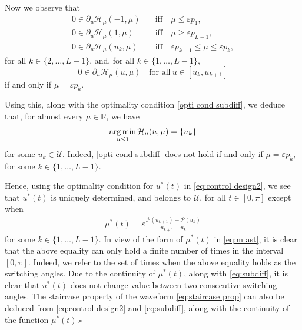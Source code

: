 \documentclass[twocolumn]{autart}    %
\begin{document}
Now we observe that
\begin{equation}\label{eq:subdiff}
	\begin{array}{ll}
		0\in \partial_u \mathcal{H}_\mu (-1,\mu) & \quad\text{iff}\quad  \mu\leq  \varepsilon p_1, 
		\\[5pt]
		0\in \partial_u \mathcal{H}_\mu (1,\mu) & \quad\text{iff} \quad \mu\geq  \varepsilon p_{L-1}, 
		\\[5pt]
		0\in \partial_u \mathcal{H}_\mu (u_k,\mu) & \quad\text{iff} \quad  \varepsilon p_{k-1} \leq \mu \leq \varepsilon p_k , 
	\end{array} 
\end{equation}
for all $k\in \{ 2, \ldots, L-1\}$,  and, for all $k\in \{ 1, \ldots, L-1 \}$,
\begin{equation*}
	0\in \partial_u \mathcal{H}_\mu (u,\mu) \quad \text{for all}\  u\in [u_k, u_{k+1}]
\end{equation*}
if and only if $\mu= \varepsilon p_k$.

Using this, along with the optimality condition \eqref{opti cond subdiff}, we deduce that, for almost every $\mu\in \mathbb{R}$, we have
\begin{align*}
	\operatorname*{arg\,min}_{u\leq 1} \mathcal{H}_\mu (u,\mu) = \{u_k\}
\end{align*}
for some $u_k\in \mathcal{U}$. Indeed, \eqref{opti cond subdiff} does not hold if and only if $\mu= \varepsilon p_k$, for some $k\in \{1,\ldots, L-1\}$.

Hence, using the optimality condition for $u^\ast(t)$ in \eqref{eq:control design2}, we see that $u^\ast(t)$ is uniquely determined, and belongs to $\mathcal{U}$, for all $t\in [0,\pi]$ except when
\begin{align*}
	\mu^\ast(t) = \varepsilon \frac{\mathcal{P}(u_{k+1}) - \mathcal{P}(u_k)}{u_{k+1} -u_k}
\end{align*} 
for some $k\in\{1,\ldots, L-1\}$. In view of the form of $\mu^\ast(t)$ in \eqref{eq:m ast}, it is clear that the above equality can only hold a finite number of times in the interval $[0,\pi]$. Indeed, we refer to the set of times when the above equality holds as the switching angles.
Due to the continuity of $\mu^\ast(t)$, along with \eqref{eq:subdiff}, it is clear that $u^\ast(t)$ does not change value between two consecutive switching angles. The staircase property of the waveform \eqref{eq:staircase prop} can also be deduced from \eqref{eq:control design2} and \eqref{eq:subdiff}, along with the continuity of the function $\mu^\ast(t)$.\hfill $\square$
\end{document}
